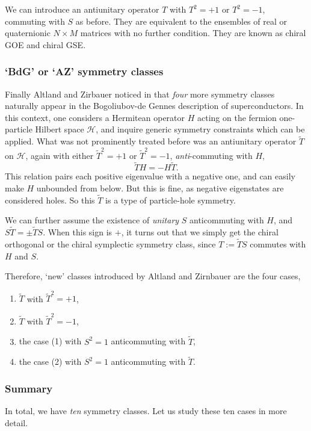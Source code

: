\documentclass[12pt]{article}
\numberwithin{equation}{section}
\numberwithin{figure}{section}
\theoremstyle{remark}
\def\cH{\mathcal{H}}
\begin{document}
We can introduce an antiunitary operator $T$ with $T^2=+1$ or $T^2=-1$,
commuting with $S$ as before.
They are equivalent to the ensembles of real or quaternionic $N\times M$ matrices 
with no further condition.
They are known as chiral GOE and chiral GSE.

\subsubsection{`BdG'  or `AZ' symmetry classes}

Finally Altland and Zirbauer noticed in \cite{Altland:1997zz} that 
\emph{four} more symmetry classes naturally appear in the Bogoliubov-de Gennes 
description of superconductors.
In this context, one considers a Hermitean operator $H$ acting on the
fermion one-particle Hilbert space $\cH$,
and inquire generic symmetry constraints which can be applied.
What was not prominently treated before \cite{Altland:1997zz} was 
an antiunitary operator $\tilde T$ on $\cH$,
again with either $\tilde T^2=+1$ or $\tilde T^2=-1$,
\emph{anti}-commuting with $H$, 
\begin{equation}
\tilde TH=-H\tilde T.
\end{equation}
This relation pairs each positive eigenvalue with a negative one,
and can easily make $H$ unbounded from below. 
But this is fine, as negative eigenstates are considered holes.
So this $\tilde T$ is a type of particle-hole symmetry.

We can further assume the existence of \emph{unitary} $S$ anticommuting with $H$,
and $S\tilde T=\pm \tilde TS$.
When this sign is $+$, it turns out that we simply get
the chiral orthogonal or the chiral symplectic symmetry class,
since $T:=\tilde TS$ commutes with $H$ and $S$.

Therefore, `new' classes introduced by Altland and Zirnbauer are
the four cases,
\begin{enumerate}
\item  $\tilde T$ with $\tilde T^2=+1$,
\item  $\tilde T$ with $\tilde T^2=-1$,
\item the case (1) with $S^2=1$ anticommuting with $\tilde T$,
\item the case (2) with $S^2=1$ anticommuting with $\tilde T$.
\end{enumerate}

\subsubsection{Summary}
In total, we have \emph{ten} symmetry classes.
Let us study these ten cases in more detail.
\end{document}
